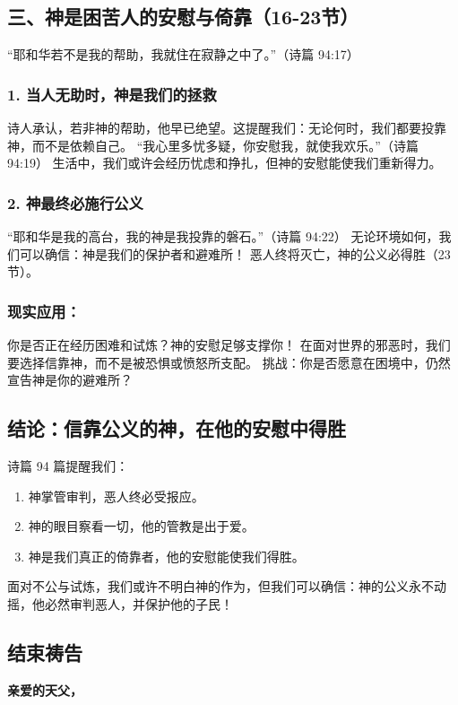 \documentclass[a4paper, 12pt]{article}
\begin{document}
\subsection*{三、神是困苦人的安慰与倚靠（16-23节）}
“耶和华若不是我的帮助，我就住在寂静之中了。”（诗篇 94:17）

\subsubsection*{1. 当人无助时，神是我们的拯救}
诗人承认，若非神的帮助，他早已绝望。这提醒我们：无论何时，我们都要投靠神，而不是依赖自己。
“我心里多忧多疑，你安慰我，就使我欢乐。”（诗篇 94:19）
生活中，我们或许会经历忧虑和挣扎，但神的安慰能使我们重新得力。
\subsubsection*{2. 神最终必施行公义}
“耶和华是我的高台，我的神是我投靠的磐石。”（诗篇 94:22）
无论环境如何，我们可以确信：神是我们的保护者和避难所！
恶人终将灭亡，神的公义必得胜（23节）。
\subsubsection*{现实应用：}

你是否正在经历困难和试炼？神的安慰足够支撑你！
在面对世界的邪恶时，我们要选择信靠神，而不是被恐惧或愤怒所支配。
挑战：你是否愿意在困境中，仍然宣告神是你的避难所？

\subsection*{结论：信靠公义的神，在他的安慰中得胜}
诗篇 94 篇提醒我们：
\begin{enumerate}
    \item 神掌管审判，恶人终必受报应。

    \item 神的眼目察看一切，他的管教是出于爱。

    \item 神是我们真正的倚靠者，他的安慰能使我们得胜。
\end{enumerate}

面对不公与试炼，我们或许不明白神的作为，但我们可以确信：神的公义永不动摇，他必然审判恶人，并保护他的子民！

\subsection*{结束祷告}
\textbf{亲爱的天父，}
\end{document}
